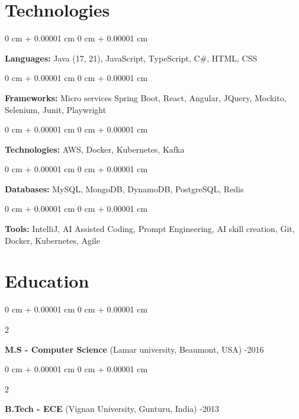 \documentclass[10pt, letterpaper]{article}
\newenvironment{onecolentry}{
    \begin{adjustwidth}{
        0 cm + 0.00001 cm
    }{
        0 cm + 0.00001 cm
    }
}{
    \end{adjustwidth}
} %
\newenvironment{twocolentry}[2][]{
    \onecolentry
    \def\secondColumn{#2}
    \setcolumnwidth{\fill, 4.5 cm}
    \begin{paracol}{2}
}{
    \switchcolumn \raggedleft \secondColumn
    \end{paracol}
    \endonecolentry
} %
\begin{document}
 \section{Technologies}

        \begin{onecolentry}
            \textbf{Languages:} Java (17, 21), JavaScript, TypeScript, C\#, HTML, CSS
        \end{onecolentry}
      \vspace{0.2 cm}
        \begin{onecolentry}
            \textbf{Frameworks:} Micro services Spring Boot, React, Angular, JQuery, Mockito, Selenium, Junit, Playwright
        \end{onecolentry}
        \vspace{0.2 cm}

        \begin{onecolentry}
            \textbf{Technologies:} AWS, Docker, Kubernetes, Kafka
        \end{onecolentry}
        
          \vspace{0.2 cm}
        \begin{onecolentry}
            \textbf{Databases:} MySQL, MongoDB, DynamoDB, PostgreSQL, Redis
        \end{onecolentry}
         \vspace{0.2 cm}
         \begin{onecolentry}
            \textbf{Tools:} IntelliJ, AI Assisted Coding, Prompt Engineering, AI skill creation, Git, Docker, Kubernetes, Agile
        \end{onecolentry}



         \section{Education}
        \begin{twocolentry}{
          2015-2016
        }
            \textbf{M.S - Computer Science} (Lamar university, Beaumont, USA)\end{twocolentry}            
       \begin{twocolentry}{
          2009-2013
        }
         \textbf{B.Tech - ECE}  (Vignan University, Gunturu, India)\end{twocolentry}
\end{document}
